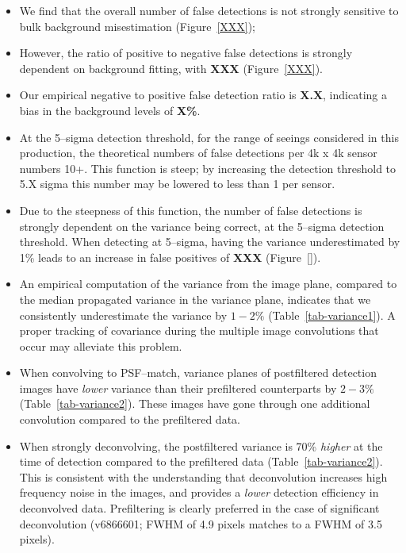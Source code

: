 \documentclass[prd, nofootinbib, floatfix, 11pt,tightenlines,times]{article}
\begin{document}
\begin{itemize}

\item We find that the overall number of false detections is not
  strongly sensitive to bulk background misestimation
  (Figure~\ref{XXX});

\item However, the ratio of positive to negative false detections is
  strongly dependent on background fitting, with {\bf XXX}
  (Figure~\ref{XXX}).

\item Our empirical negative to positive false detection ratio is {\bf
  X.X}, indicating a bias in the background levels of {\bf X\%}.

\item At the 5--sigma detection threshold, for the range of seeings
  considered in this production, the theoretical numbers of false
  detections per 4k x 4k sensor numbers 10+.  This function is steep;
  by increasing the detection threshold to 5.X sigma this number may
  be lowered to less than 1 per sensor.

\item Due to the steepness of this function, the number of false
  detections is strongly dependent on the variance being correct, at
  the 5--sigma detection threshold.  When detecting at 5--sigma,
  having the variance underestimated by 1\% leads to an increase
  in false positives of {\bf XXX} (Figure~\ref{}).

\item An empirical computation of the variance from the image plane,
  compared to the median propagated variance in the variance plane,
  indicates that we consistently underestimate the variance by $1-2\%$
  (Table~\ref{tab-variance1}).  A proper tracking of covariance during
  the multiple image convolutions that occur may alleviate this
  problem.

\item When convolving to PSF--match, variance planes of postfiltered
  detection images have {\it lower} variance than their prefiltered
  counterparts by $2-3\%$ (Table~\ref{tab-variance2}).  These images
  have gone through one additional convolution compared to the
  prefiltered data.

\item When strongly deconvolving, the postfiltered variance is 70\%
  {\it higher} at the time of detection compared to the prefiltered
  data (Table~\ref{tab-variance2}).  This is consistent with the
  understanding that deconvolution increases high frequency noise in
  the images, and provides a {\it lower} detection efficiency in
  deconvolved data.  Prefiltering is clearly preferred in the case of
  significant deconvolution (v6866601; FWHM of 4.9 pixels matches to a
  FWHM of 3.5 pixels).


\end{itemize}
\end{document}
